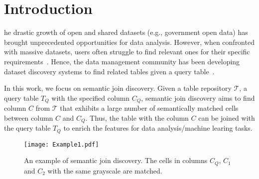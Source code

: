 \section{Introduction}
\label{sec:intro}

he drastic growth of open and shared datasets (e.g., government open data)
has brought unprecedented opportunities for data analysis. However, when confronted with massive datasets, users often struggle to find 
relevant ones for their specific requirements~\cite{WarpGate}.
Hence, the data management community has been developing dataset discovery systems to find related tables given a query table~\cite{TabelDiscovery}.


In this work, we focus on semantic join discovery.
Given a table repository $\mathcal{T}$, a query table $T_Q$ with the specified column $C_Q$,  semantic join discovery aims to find column $C$  from  $\mathcal{T}$ that exhibits a large number of semantically matched cells between column $C$ and $C_Q$. Thus, the table with the column $C$ can be joined with the query table $T_Q$ to enrich the features for data analysis/machine learing tasks.



\begin{figure}
  \centering
  \texttt{[image: Example1.pdf]} \vspace{-5mm}
   \caption{An example of semantic join discovery. The cells in columns $C_Q$, $C_1$ and $C_2$ with the same grayscale are matched.}
  \label{fig:exm1}
 \vspace{-6mm}
\end{figure}





